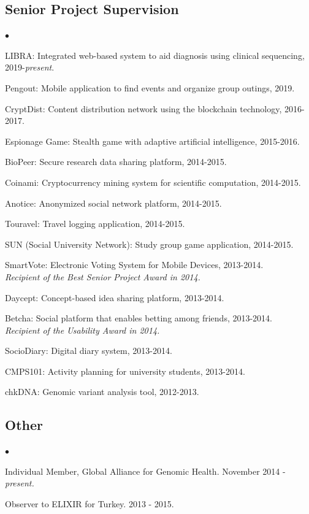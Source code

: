 \documentclass[margin,line]{res}
\newenvironment{list2}{
  \begin{list}{$\bullet$}{%
      \setlength{\itemsep}{0.1cm}
      \setlength{\parsep}{0in} \setlength{\parskip}{0in}
      \setlength{\topsep}{0in} \setlength{\partopsep}{0in} 
      \setlength{\leftmargin}{0.2in}}}{\end{list}}
\begin{document}
\begin{resume}
\subsection{\small \sc Senior Project Supervision}
\begin{list2}
\item LIBRA: Integrated web-based system to aid diagnosis using clinical sequencing, 2019-\textit{present}.
\item Pengout: Mobile application to find events and organize group outings, 2019.
  \item CryptDist: Content distribution network using the blockchain technology, 2016-2017.
\item Espionage Game: Stealth game with adaptive artificial intelligence, 2015-2016.
  \item BioPeer: Secure research data sharing platform, 2014-2015.
  \item Coinami: Cryptocurrency mining system for scientific computation, 2014-2015.
  \item Anotice: Anonymized social network platform, 2014-2015.
  \item Touravel: Travel logging application, 2014-2015. 
  \item SUN (Social University Network): Study group game application, 2014-2015.
  \item SmartVote: Electronic Voting System for Mobile Devices, 2013-2014. \\
    {\it Recipient of the Best Senior Project Award in 2014.}
  \item Daycept: Concept-based idea sharing platform, 2013-2014.
  \item Betcha: Social platform that enables betting among friends, 2013-2014.\\
    {\it Recipient of the Usability Award in 2014.}
  \item SocioDiary: Digital diary system, 2013-2014.
  \item CMPS101: Activity planning for university students, 2013-2014.
  \item chkDNA: Genomic variant analysis tool, 2012-2013.
\end{list2}


\vspace{-0.4cm}
\subsection{\small \sc Other}
\begin{list2}
\item
  Individual Member, Global Alliance for Genomic Health. November 2014 - {\it present.}
\item
  Observer to ELIXIR for Turkey. 2013 - 2015.
\end{list2}



\end{resume}
\end{document}
